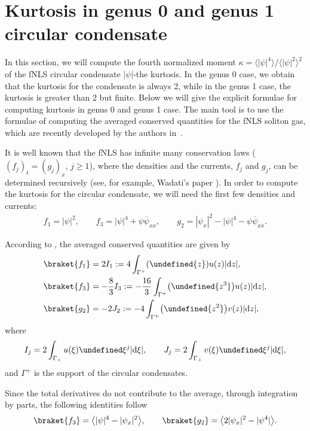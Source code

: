 \documentclass[10pt,a4paper]{amsart}
\numberwithin{equation}{section}
\let\Im\undefined
\DeclareMathOperator{\Im}{Im}
\newcommand{\G}{\Gamma}
\def\G{\Gamma}
\begin{document}
\section{Kurtosis in genus 0 and genus 1 circular condensate}\label{sec-kurt}

In this section, we will compute the fourth normalized moment $\kappa=\bigl\langle|\psi|^4\bigr\rangle/\bigl\langle|\psi|^2\bigr\rangle^2$ of the fNLS circular condensate $|\psi|$-the kurtosis. In the genus 0 case, we obtain that the kurtosis for the condensate is always 2, while in the genus 1 case, the kurtosis is greater than 2 but finite. Below we will give the explicit formulae for computing kurtosis in genus 0 and genus 1 case. The main tool is to use the formulae of computing the averaged conserved quantities for the fNLS soliton gas, which are recently developed by the authors in~\cite{TW}.

It is well known that the fNLS has infinite many conservation laws ($(f_j)_t=(g_j)_x$, $j\geq 1$), where the densities and the currents, $f_j$ and $g_j$, can be determined recursively (see, for example, Wadati's paper \cite{Wadati}). In order to compute the kurtosis for the circular condensate, we will need the first few densities and currents:
\begin{align*}
f_1=|\psi|^2,\qquad
f_3=|\psi|^4+\psi\overline{\psi}_{xx},\qquad
g_2=|\psi_x|^2-|\psi|^4-\psi\overline{\psi}_{xx}.
\end{align*}

According to \cite{TW}, the averaged conserved quantities are given by
\begin{align*}
&\braket{f_1}=2I_1:=4\int_{\G^+}(\Im{z})u(z)|{\rm d}z|,\\
&\braket{f_3}=-\frac{8}{3}I_3:=-\frac{16}{3}\int_{\G^+}\bigl(\Im{z^3}\bigr)u(z)|{\rm d}z|,\\
&\braket{g_2}=-2J_2:=-4\int_{\G^+}\bigl(\Im{z^2}\bigr)v(z)|{\rm d}z|,
\end{align*}
where
\begin{align}
I_j=2\int_{\Gamma_+}u(\xi)\Im \xi^j|{\rm d}\xi|,\label{eq:Ij}\qquad
J_j=2\int_{\Gamma_+}v(\xi)\Im \xi^j|{\rm d}\xi|,
\end{align}
and $\G^+$ is the support of the circular condensates.

Since the total derivatives do not contribute to the average, through integration by parts, the following identities follow
\begin{align*}
\braket{f_3}=\bigl\langle|\psi|^4-|\psi_x|^2\bigr\rangle,\qquad
\braket{g_2}=\bigl\langle 2|\psi_x|^2-|\psi^4|\bigr\rangle.
\end{align*}
\end{document}
